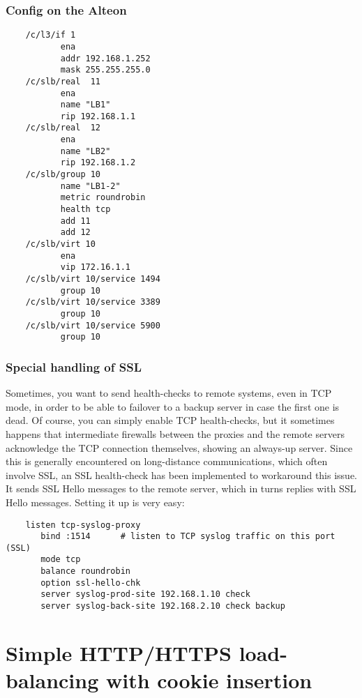 \subsubsection{Config on the Alteon}

\begin{verbatim}
    /c/l3/if 1
           ena
           addr 192.168.1.252
           mask 255.255.255.0
    /c/slb/real  11
           ena
           name "LB1"
           rip 192.168.1.1
    /c/slb/real  12
           ena
           name "LB2"
           rip 192.168.1.2
    /c/slb/group 10
           name "LB1-2"
           metric roundrobin
           health tcp
           add 11
           add 12
    /c/slb/virt 10
           ena
           vip 172.16.1.1
    /c/slb/virt 10/service 1494
           group 10
    /c/slb/virt 10/service 3389
           group 10
    /c/slb/virt 10/service 5900
           group 10
\end{verbatim}

\subsubsection{Special handling of SSL}

Sometimes, you want to send health-checks to remote systems, even in TCP mode,
in order to be able to failover to a backup server in case the first one is
dead. Of course, you can simply enable TCP health-checks, but it sometimes
happens that intermediate firewalls between the proxies and the remote servers
acknowledge the TCP connection themselves, showing an always-up server. Since
this is generally encountered on long-distance communications, which often
involve SSL, an SSL health-check has been implemented to workaround this issue.
It sends SSL Hello messages to the remote server, which in turns replies with
SSL Hello messages. Setting it up is very easy:

\begin{verbatim}
    listen tcp-syslog-proxy
       bind :1514      # listen to TCP syslog traffic on this port (SSL)
       mode tcp
       balance roundrobin
       option ssl-hello-chk
       server syslog-prod-site 192.168.1.10 check
       server syslog-back-site 192.168.2.10 check backup
\end{verbatim}


\section{Simple HTTP/HTTPS load-balancing with cookie insertion}

